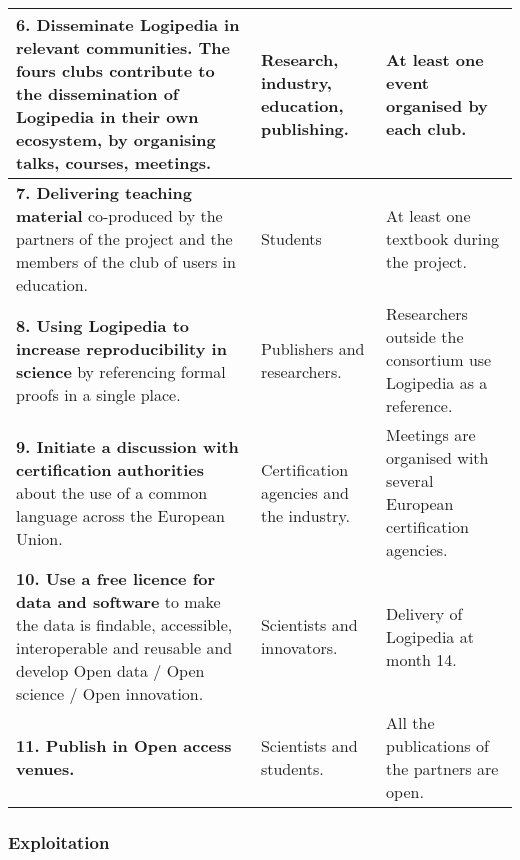 \begin{longtable}{|p{}|p{}|p{}|}
\hline
{\bf 6. Disseminate Logipedia in relevant communities.}
The fours clubs contribute to the dissemination of
Logipedia in their own ecosystem, by organising talks,
courses, meetings.
&
Research, industry,
education, publishing.
&
At least one event organised by each club.
\\
\hline
{\bf 7. Delivering teaching material}
co-produced by 
the partners of the project and the members of
the club of users in education. 
&
Students
&
At least one textbook during the project.
\\
\hline
{\bf 8. Using Logipedia to increase reproducibility in science}
by referencing formal proofs in a single place. 
&
Publishers and researchers.
&
Researchers outside the consortium use Logipedia as a reference.
\\
\hline
{\bf 9. Initiate a discussion with certification authorities}
about the use of a common language across the European Union.
&
Certification agencies and the industry. 
&
Meetings are organised with several European certification agencies.
\\
\hline
{\bf 10. Use a free licence for data and software} to make 
the data is findable, accessible, interoperable and reusable
and develop Open data / Open science / Open innovation.
&
Scientists and innovators.
&
Delivery of Logipedia at month 14.
\\
\hline
{\bf 11. Publish in Open access venues.}
&
Scientists and students.
&
All the publications of the partners are open.
\\
\hline
\end{longtable}


\subsubsection*{Exploitation}


